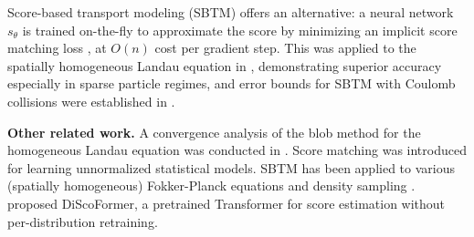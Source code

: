 \documentclass[]{article}
\numberwithin{equation}{section}
\begin{document}
Score-based transport modeling (SBTM) \citep{boffi2023probability} offers an alternative: a neural network $s_\theta$ is trained on-the-fly to approximate the score by minimizing an implicit score matching loss \citep{hyvarinen2005estimation}, at $O(n)$ cost per gradient step.  This was applied to the spatially homogeneous Landau equation in \citep{ilin2025transport, huang2024score}, demonstrating superior accuracy especially in sparse particle regimes, and error bounds for SBTM with Coulomb collisions were established in \citep{ilin2025stability}.

\textbf{Other related work.}  A convergence analysis of the blob method for the homogeneous Landau equation was conducted in \citep{carrillo2023convergence}. Score matching \citep{hyvarinen2005estimation} was introduced for learning unnormalized statistical models.  SBTM has been applied to various (spatially homogeneous) Fokker-Planck equations \citep{shen2022self, shen2023entropy, lu2024score} and density sampling \citep{ilin2025score}.  \citep{ilin2026kernels} proposed DiScoFormer, a pretrained Transformer for score estimation without per-distribution retraining.  

\end{document}
